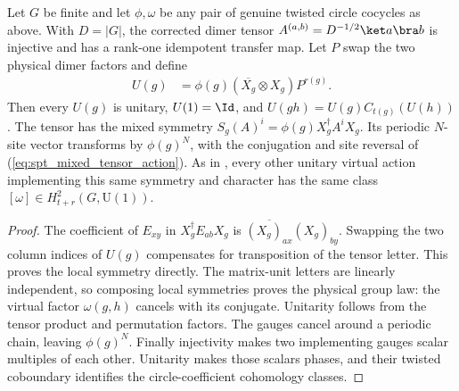 \begin{lemma}
    \label{thm:spt_mixed_fixed_point}
    \leanok
    Let $G$ be finite and let $\phi,\omega$ be any pair of genuine twisted
    circle cocycles as above. With $D=|G|$, the corrected dimer tensor
    $A^{(a,b)}=D^{-1/2}\ket a\bra b$ is injective and has a rank-one
    idempotent transfer map. Let $P$ swap the two physical dimer factors and
    define
    \begin{align}
        U(g) & =\phi(g)(\overline{X_g}\otimes X_g)P^{r(g)}.
        \label{eq:spt_mixed_fixed_point_action}
    \end{align}
    Then every $U(g)$ is unitary, $U(1)=\Id$, and
    $U(gh)=U(g)C_{t(g)}(U(h))$. The tensor has the mixed symmetry
    $S_g(A)^i=\phi(g)X_g^\dagger A^iX_g$. Its periodic $N$-site vector
    transforms by $\phi(g)^N$, with the conjugation and site reversal
    of (\ref{eq:spt_mixed_tensor_action}). As in
    \cite[Section~III.A, local TeX lines~1147--1157]{Cirac2021Matrix},
    every other unitary virtual action implementing this same symmetry and
    character has the same class $[\omega]\in H^2_{t+r}(G,\mathrm U(1))$.
\end{lemma}
\begin{proof}\leanok
    The coefficient of $E_{xy}$ in $X_g^\dagger E_{ab}X_g$ is
    $\overline{(X_g)_{ax}}(X_g)_{by}$. Swapping the two column indices of
    $U(g)$ compensates for transposition of the tensor letter. This proves
    the local symmetry directly. The matrix-unit letters are linearly
    independent, so composing local symmetries proves the physical group law:
    the virtual factor $\omega(g,h)$ cancels with its conjugate.
    Unitarity follows from the tensor product and permutation factors.
    The gauges cancel around a periodic chain, leaving $\phi(g)^N$.
    Finally injectivity makes two implementing gauges scalar multiples of
    each other. Unitarity makes those scalars phases, and their twisted
    coboundary identifies the circle-coefficient cohomology classes.
\end{proof}
